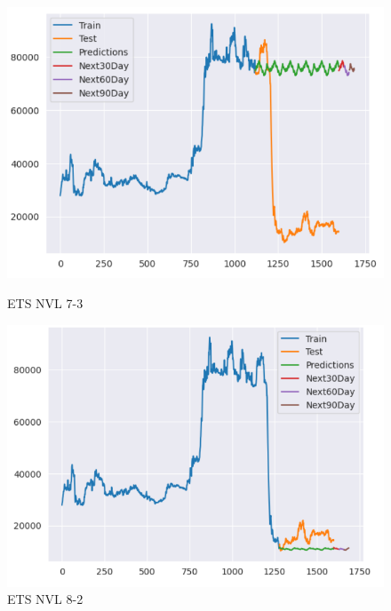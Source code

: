 \documentclass[conference]{IEEEtran}
\begin{document}
\begin{figure}[htbp]
    \begin{minipage}{0.23\textwidth}
    \centering
    \includegraphics[width=1\textwidth]{experiment/ets/TEAM4_ETS_NVL_7_3.png}
    \caption{ETS NVL 7-3}
    \label{fig:nvl_boxplot}
    \end{minipage}
    \hfill
    \begin{minipage}{0.23\textwidth}
    \centering
    \includegraphics[width=1\textwidth]{experiment/ets/TEAM4_ETS_NVL_8_2.png}
    \caption{ETS NVL 8-2}
    \label{fig:nvl_histogram}
    \end{minipage}
    \begin{minipage}{0.23\textwidth}
    \centering

\end{minipage}
\end{figure}
\end{document}
